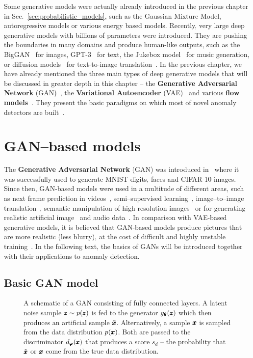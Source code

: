 Some generative models were actually already introduced in the previous chapter in Sec.~\ref{sec:probabilistic_models}, such as the Gaussian Mixture Model, autoregressive models or various energy based models. Recently, very large deep generative models with billions of parameters were introduced. They are pushing the boundaries in many domains and produce human-like outputs, such as the BigGAN~\cite{brock2018large} for images, GPT-3~\cite{brown2020language} for text, the Jukebox model~\cite{dhariwal2020jukebox} for music generation, or diffusion models~\cite{sohl2015deep} for text-to-image translation~\cite{saharia2022photorealistic}. In the previous chapter, we have already mentioned the three main types of deep generative models that will be discussed in greater depth in this chapter -- the \textbf{Generative Adversarial Network} (GAN)~\cite{goodfellow2014gan}, the \textbf{Variational Autoencoder} (VAE)~\cite{kingma2013vae} and various \textbf{flow models}~\cite{dinh2014nice}. They present the basic paradigms on which most of novel anomaly detectors are built~\cite{an2015variational,xu2018unsupervised,wang2018generative,perera2019ocgan,yamaguchi2019adaflow,schmidtNormalizingFlowsNovelty2019}. 

\section{GAN--based models} \label{sec:gan_models}
The \textbf{Generative Adversarial Network} (GAN) was introduced in~\cite{goodfellow2014gan} where it was successfully used to generate MNIST digits, faces and CIFAR-10 images. Since then, GAN-based models were used in a multitude of different areas, such as next frame prediction in videos~\cite{lotter2015unsupervised}, semi--supervised learning~\cite{salimans2016fmgan}, image--to--image translation~\cite{zhu2016generative}, semantic manipulation of high resolution images~\cite{wang2018high} or for generating realistic artificial image~\cite{karras2019style} and audio data~\cite{lee2022bigvgan}. In comparison with VAE-based generative models, it is believed that GAN-based models produce pictures that are more realistic (less blurry), at the cost of difficult and highly unstable training~\cite{salimans2016fmgan}. In the following text, the basics of GANs will be introduced together with their applications to anomaly detection. 

\subsection{Basic GAN model}
\begin{figure}
\centering{}\caption{A schematic of a GAN consisting of fully connected layers. A latent
noise sample $\pmb{{z}}\sim p(\pmb{{z}})$ is fed to the generator $g_{\pmb{{\theta}}}(\pmb{{z}})$
which then produces an artificial sample $\tilde{\pmb{{x}}}$. Alternatively,
a sample $\pmb{{x}}$ is sampled from the data distribution $p(\pmb{{x}})$. Both
are passed to the discriminator $d_{\pmb{{\varphi}}}(\pmb{{x}})$ that produces a score
$s_d$ -- the probability that $\tilde{\pmb{{x}}}$ or $\pmb{{x}}$ come from the
true data distribution.}
\label{fig:gan}
\end{figure}

